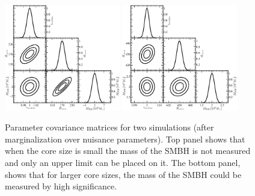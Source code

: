 \documentclass[chicago]{emulateapj}
\begin{document}
\begin{figure}
\begin{center}
\centering
\includegraphics[trim= 0 0 0 0, width=0.45\textwidth]{figures/f_04_A.eps}
\includegraphics[trim= 0 0 0 0, width=0.45\textwidth]{figures/f_04_B.eps}
\centering
\end{center}
\caption{ Parameter covariance matrices for two simulations (after marginalization over nuisance parameters). Top panel shows that when the core size is small the mass of the SMBH is not measured and only an upper limit can be placed on it. The bottom panel, shows that for larger core sizes, the mass of the SMBH could be measured by high significance. 
\label{fig:4}}
\end{figure}
\end{document}
